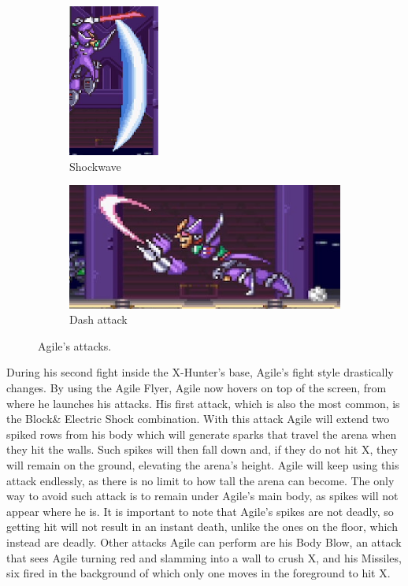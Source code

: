 \begin{figure}[htp]
	\centering
	\begin{subfigure}{0.3\linewidth}
		\centering
		\includegraphics[height=5cm]{figures/X2/Hunter_stages/Agile_crescent.png}
		\caption{Shockwave}	
	\end{subfigure}
	\begin{subfigure}{0.6\linewidth}
		\centering
		\includegraphics[width=\linewidth]{figures/X2/Hunter_stages/Agile_dash.png}
		\caption{Dash attack}
	\end{subfigure}
	
	\caption{Agile's attacks.}	
\end{figure}
During his second fight inside the X-Hunter's base, Agile's fight style drastically changes. By using the Agile Flyer, Agile now hovers on top of the screen, from where he launches his attacks. His first attack, which is also the most common, is the Block\& Electric Shock combination. With this attack Agile will extend two spiked rows from his body which will generate sparks that travel the arena when they hit the walls. Such spikes will then fall down and, if they do not hit X, they will remain on the ground, elevating the arena's height. Agile will keep using this attack endlessly, as there is no limit to how tall the arena can become. The only way to avoid such attack is to remain under Agile's main body, as spikes will not appear where he is. It is important to note that Agile's spikes are not deadly, so getting hit will not result in an instant death, unlike the ones on the floor, which instead are deadly. Other attacks Agile can perform are his Body Blow, an attack that sees Agile turning red and slamming into a wall to crush X, and his Missiles, six fired in the background of which only one moves in the foreground to hit X. 
